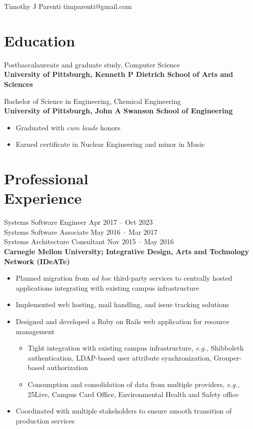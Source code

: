\documentclass[11pt]{article}
\newcommand{\textdb}[1]{\fontseries{db}\selectfont#1\normalfont}
\begin{document}
\begin{adjustwidth}{-1in}{0pt}
	\textsf{\Huge{Timothy J Parenti}} \hfill timparenti@gmail.com \par
	\hrulefill
\end{adjustwidth}



\section{Education}

\textdb{
Postbaccalaureate and graduate study, Computer Science
	\\
}
\textbf{University of Pittsburgh, Kenneth P Dietrich School of Arts and Sciences}

\textdb{
Bachelor of Science in Engineering, Chemical Engineering
	\\
}
\textbf{University of Pittsburgh, John A Swanson School of Engineering}
\begin{itemize}
	\item Graduated with \emph{cum laude} honors
	\item Earned certificate in Nuclear Engineering and minor in Music
\end{itemize}



\section{Professional\\ Experience}

\textdb{
Systems Software Engineer
	\hfill Apr 2017 -- Oct 2023 \\
}
\textdb{
Systems Software Associate
	\hfill May 2016 -- Mar 2017 \\
}
\textdb{
Systems Architecture Consultant
	\hfill Nov 2015 -- May 2016 \\
}
\textbf{Carnegie Mellon University; Integrative Design, Arts and Technology Network (IDeATe)}
\begin{itemize}
	\item Planned migration from \emph{ad hoc} third-party services
		to centrally hosted applications
		integrating with existing campus infrastructure
	\item Implemented web hosting, mail handling, and issue tracking solutions
	\item Designed and developed a Ruby on Rails web application for resource management
		\begin{itemize}
			\item Tight integration with existing campus infrastructure, \emph{e.g.,}
				Shibboleth authentication,
				LDAP-based user attribute synchronization,
				Grouper-based authorization
			\item Consumption and consolidation of data from multiple providers, \emph{e.g.,}
				25Live,
				Campus Card Office,
				Environmental Health and Safety office
		\end{itemize}
	\item Coordinated with multiple stakeholders
		to ensure smooth transition of production services
\end{itemize}
\end{document}
